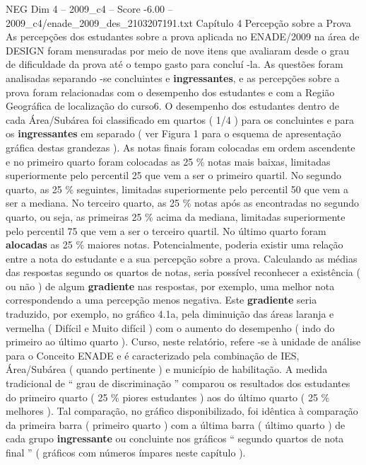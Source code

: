 \begin{textsample}{NEG Dim 4 – 2009\_c4 – Score -6.00 – 2009\_c4/enade\_2009\_des\_2103207191.txt}  \label{ex:f4_neg_028}
Capítulo 4 Percepção sobre a Prova As percepções dos estudantes sobre a prova aplicada no ENADE/2009 na área de DESIGN foram mensuradas por meio de nove itens que avaliaram desde o grau de dificuldade da prova até o tempo gasto para concluí -la.
As questões foram analisadas separando -se concluintes e \textbf{ingressantes}, e as percepções sobre a prova foram relacionadas com o desempenho dos estudantes e com a Região Geográfica de localização do curso6.
O desempenho dos estudantes dentro de cada Área/Subárea foi classificado em quartos ( 1/4 ) para os concluintes e para os \textbf{ingressantes} em separado ( ver Figura 1 para o esquema de apresentação gráfica destas grandezas ).
As notas finais foram colocadas em ordem ascendente e no primeiro quarto foram colocadas as 25 \% notas mais baixas, limitadas superiormente pelo percentil 25 que vem a ser o primeiro quartil.
No segundo quarto, as 25 \% seguintes, limitadas superiormente pelo percentil 50 que vem a ser a mediana.
No terceiro quarto, as 25 \% notas após as encontradas no segundo quarto, ou seja, as primeiras 25 \% acima da mediana, limitadas superiormente pelo percentil 75 que vem a ser o terceiro quartil.
No último quarto foram \textbf{alocadas} as 25 \% maiores notas.
Potencialmente, poderia existir uma relação entre a nota do estudante e a sua percepção sobre a prova.
Calculando as médias das respostas segundo os quartos de notas, seria possível reconhecer a existência ( ou não ) de algum \textbf{gradiente} nas respostas, por exemplo, uma melhor nota correspondendo a uma percepção menos negativa.
Este \textbf{gradiente} seria traduzido, por exemplo, no gráfico 4.1a, pela diminuição das áreas laranja e vermelha ( Difícil e Muito difícil ) com o aumento do desempenho ( indo do primeiro ao último quarto ).
Curso, neste relatório, refere -se à unidade de análise para o Conceito ENADE e é caracterizado pela combinação de IES, Área/Subárea ( quando pertinente ) e município de habilitação.
A medida tradicional de “ grau de discriminação ” comparou os resultados dos estudantes do primeiro quarto ( 25 \% piores estudantes ) aos do último quarto ( 25 \% melhores ).
Tal comparação, no gráfico disponibilizado, foi idêntica à comparação da primeira barra ( primeiro quarto ) com a última barra ( último quarto ) de cada grupo \textbf{ingressante} ou concluinte nos gráficos “ segundo quartos de nota final ” ( gráficos com números ímpares neste capítulo ).

\end{textsample}
